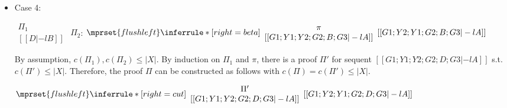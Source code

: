 \begin{itemize}
\item Case 4:
      \begin{center}
        \scriptsize
        \begin{math}
          \begin{array}{c}
            \Pi_1 \\
            {[[D |-l B]]}
          \end{array}
        \end{math}
        \qquad\qquad
        $\Pi_2$:
        \begin{math}
          $$\mprset{flushleft}
          \inferrule* [right={\tiny beta}] {
            {
              \begin{array}{c}
                \pi \\
                {[[G1; Y1; Y2; G2; B; G3 |-l A]]}
              \end{array}
            }
          }{[[G1; Y2; Y1; G2; B; G3 |-l A]]}
        \end{math}
      \end{center}
      By assumption, $c(\Pi_1),c(\Pi_2)\leq |X|$. By induction on $\Pi_1$
      and $\pi$, there is a proof $\Pi'$ for sequent
      $[[G1; Y1; Y2; G2; D; G3 |-l A]]$ s.t. $c(\Pi') \leq |X|$. Therefore,
      the proof $\Pi$ can be constructed as follows with
      $c(\Pi) = c(\Pi') \leq |X|$.
      \begin{center}
        \scriptsize
        \begin{math}
          $$\mprset{flushleft}
          \inferrule* [right={\tiny cut}] {
            {
              \begin{array}{cc}
                \Pi' \\
                {[[G1; Y1; Y2; G2; D; G3 |-l A]]}
              \end{array}
            }
          }{[[G1; Y2; Y1; G2; D; G3 |-l A]]}
        \end{math}
      \end{center}
\end{itemize}



